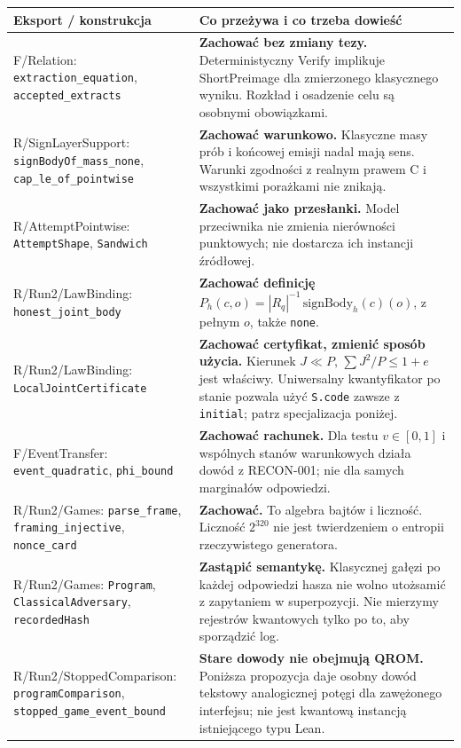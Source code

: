 \documentclass[11pt,a4paper]{article}
\newcommand{\code}[1]{\nolinkurl{#1}}
\begin{document}
\small
\begin{longtable}{@{}p{.34\linewidth}p{.61\linewidth}@{}}
\toprule Eksport / konstrukcja & Co przeżywa i co trzeba dowieść \\\midrule
\endhead
F/Relation: \code{extraction_equation}, \code{accepted_extracts}
& \textbf{Zachować bez zmiany tezy.} Deterministyczny Verify implikuje
ShortPreimage dla zmierzonego klasycznego wyniku. Rozkład i osadzenie celu
są osobnymi obowiązkami.\\
R/SignLayerSupport: \code{signBodyOf_mass_none}, \code{cap_le_of_pointwise}
& \textbf{Zachować warunkowo.} Klasyczne masy prób i końcowej emisji nadal
mają sens. Warunki zgodności z realnym prawem C i wszystkimi porażkami
nie znikają.\\
R/AttemptPointwise: \code{AttemptShape}, \code{Sandwich}
& \textbf{Zachować jako przesłanki.} Model przeciwnika nie zmienia
nierówności punktowych; nie dostarcza ich instancji źródłowej.\\
R/Run2/LawBinding: \code{honest_joint_body}
& \textbf{Zachować definicję} $P_h(c,o)=|R_q|^{-1}\,\mathrm{signBody}_h(c)(o)$,
z pełnym $o$, także \code{none}.\\
R/Run2/LawBinding: \code{LocalJointCertificate}
& \textbf{Zachować certyfikat, zmienić sposób użycia.} Kierunek $J\ll P$,
$\sum J^2/P\le1+e$ jest właściwy. Uniwersalny kwantyfikator po stanie
pozwala użyć \code{S.code} zawsze z \code{initial}; patrz specjalizacja poniżej.\\
F/EventTransfer: \code{event_quadratic}, \code{phi_bound}
& \textbf{Zachować rachunek.} Dla testu $v\in[0,1]$ i wspólnych stanów
warunkowych działa dowód z RECON-001; nie dla samych marginałów odpowiedzi.\\
R/Run2/Games: \code{parse_frame}, \code{framing_injective}, \code{nonce_card}
& \textbf{Zachować.} To algebra bajtów i liczność. Liczność $2^{320}$ nie
jest twierdzeniem o entropii rzeczywistego generatora.\\
R/Run2/Games: \code{Program}, \code{ClassicalAdversary}, \code{recordedHash}
& \textbf{Zastąpić semantykę.} Klasycznej gałęzi po każdej odpowiedzi hasza
nie wolno utożsamić z zapytaniem w superpozycji. Nie mierzymy rejestrów
kwantowych tylko po to, aby sporządzić log.\\
R/Run2/StoppedComparison: \code{programComparison},
\code{stopped_game_event_bound}
& \textbf{Stare dowody nie obejmują QROM.} Poniższa propozycja daje osobny
dowód tekstowy analogicznej potęgi dla zawężonego interfejsu; nie jest
kwantową instancją istniejącego typu Lean.\\

\end{longtable}
\end{document}
